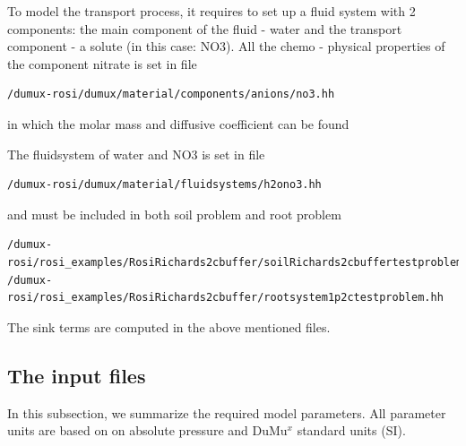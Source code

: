 To model the transport process, it requires to set up a fluid system
with 2 components: the main component of the fluid - water and the
transport component - a solute (in this case: NO3).
 All the chemo - physical properties of the component
nitrate is set in file

\begin{lstlisting}
/dumux-rosi/dumux/material/components/anions/no3.hh 
\end{lstlisting}

in which the molar mass and diffusive coefficient can be found


The fluidsystem of water and NO3 is set in file

\begin{lstlisting}
/dumux-rosi/dumux/material/fluidsystems/h2ono3.hh
\end{lstlisting}

and must be included in both soil problem and root problem

\begin{lstlisting}
/dumux-rosi/rosi_examples/RosiRichards2cbuffer/soilRichards2cbuffertestproblem.hh
/dumux-rosi/rosi_examples/RosiRichards2cbuffer/rootsystem1p2ctestproblem.hh
\end{lstlisting}


The sink terms are computed in the above mentioned files.





\subsection*{The input files}

In this subsection, we summarize the required model parameters. All
parameter units are based on on absolute pressure and DuMu$^{x}$
standard units (SI).

